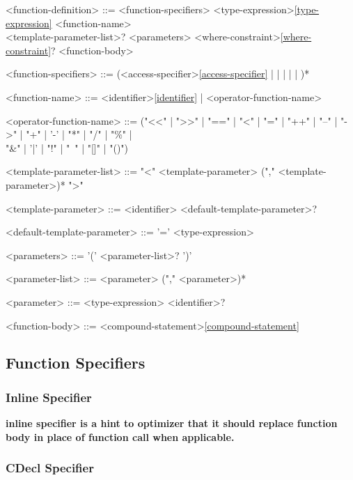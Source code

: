 \documentclass[a4paper,oneside,11pt]{article}
\begin{document}
\begin{grammar}
\label{function-definition}<function-definition> ::= <function-specifiers> <type-expression>\ref{type-expression} <function-name>\\
<template-parameter-list>? <parameters> <where-constraint>\ref{where-constraint}? <function-body>

<function-specifiers> ::= (<access-specifier>\ref{access-specifier} |  |  |  |  | )*

\label{function-name}<function-name> ::= <identifier>\ref{identifier} | <operator-function-name>

<operator-function-name> ::=  ("<<" | ">>" | "==" | "<" | "=" | "++" | "--" | "->" | "+" | '-' | "*" | "/" | "\%" |\\
"\&" | '|' | "!" | "~" | "[]" | "()")

\label{template-parameter-list}<template-parameter-list> ::= "<" <template-parameter>  ("," <template-parameter>)* ">"

<template-parameter> ::= <identifier> <default-template-parameter>?

<default-template-parameter> ::= '=' <type-expression>

\label{parameters}<parameters> ::= '(' <parameter-list>? ')'

\label{parameter-list}<parameter-list> ::= <parameter> ("," <parameter>)*

<parameter> ::= <type-expression> <identifier>?

\label{function-body}<function-body> ::= <compound-statement>\ref{compound-statement}

\end{grammar}

\subsection{Function Specifiers}

\subsubsection{Inline Specifier}

\bf{inline} specifier is a hint to optimizer that
it should replace function body in place of function call when applicable.

\subsubsection{CDecl Specifier}
\end{document}
